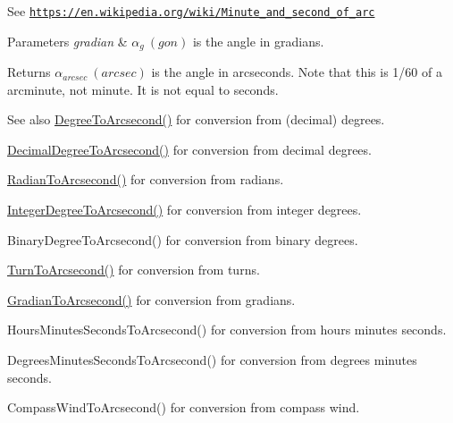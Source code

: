 See \href{https://en.wikipedia.org/wiki/Minute_and_second_of_arc}{\tt https\+://en.\+wikipedia.\+org/wiki/\+Minute\+\_\+and\+\_\+second\+\_\+of\+\_\+arc} 
\begin{DoxyParams}{Parameters}
{\em gradian} & $\alpha_{g}\ (gon)$ is the angle in gradians. \\
\hline
\end{DoxyParams}
\begin{DoxyReturn}{Returns}
$\alpha_{arcsec}\ (arcsec)$ is the angle in arcseconds. Note that this is 1/60 of a arcminute, not minute. It is not equal to seconds. 
\end{DoxyReturn}
\begin{DoxySeeAlso}{See also}
\mbox{\hyperlink{group___e_g_x_math-_angle_conversions-_degree_gaf85e2d765c248f447854a807a68a5de8}{Degree\+To\+Arcsecond()}} for conversion from (decimal) degrees. 

\mbox{\hyperlink{group___e_g_x_math-_angle_conversions-_decimal_degree_gab9d5635a6e35127b5245978aba508962}{Decimal\+Degree\+To\+Arcsecond()}} for conversion from decimal degrees. 

\mbox{\hyperlink{group___e_g_x_math-_angle_conversions-_radian_ga2f952f6675a0fc54bf72bfe4e3d2664a}{Radian\+To\+Arcsecond()}} for conversion from radians. 

\mbox{\hyperlink{group___e_g_x_math-_angle_conversions-_integer_degree_gaa04058a2fea3dc3678264a05fac6e1ae}{Integer\+Degree\+To\+Arcsecond()}} for conversion from integer degrees. 

Binary\+Degree\+To\+Arcsecond() for conversion from binary degrees. 

\mbox{\hyperlink{group___e_g_x_math-_angle_conversions-_turn_gaad072969abc59ef6f5b63ac6a176a11b}{Turn\+To\+Arcsecond()}} for conversion from turns. 

\mbox{\hyperlink{group___e_g_x_math-_angle_conversions-_gradian_gac768fd444195264165d332f2f5e84d92}{Gradian\+To\+Arcsecond()}} for conversion from gradians. 

Hours\+Minutes\+Seconds\+To\+Arcsecond() for conversion from hours minutes seconds. 

Degrees\+Minutes\+Seconds\+To\+Arcsecond() for conversion from degrees minutes seconds. 

Compass\+Wind\+To\+Arcsecond() for conversion from compass wind. 
\end{DoxySeeAlso}
\mbox{\label{group___e_g_x_math-_angle_conversions-_gon_ga4f3f154b9c553b22af2621ac3d196648}} 
